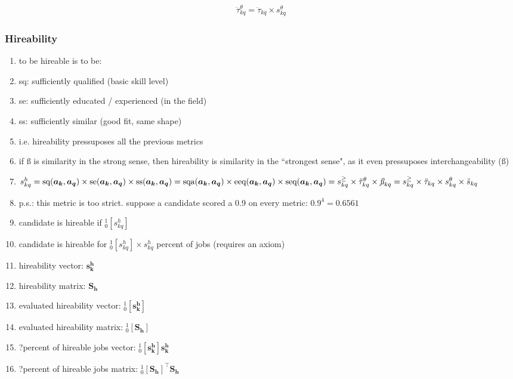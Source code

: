 \documentclass{elsarticle} %
\begin{document}
\begin{gather}
    \ddot{\tau}_{kq}^{\theta} = \ddot{\tau}_{kq} \times s_{kq}^{\theta}
\end{gather}

\subsubsection{Hireability}
\begin{enumerate}
    \item to be hireable is to be:
    \item sq: sufficiently qualified (basic skill level)
    \item se: sufficiently educated / experienced (in the field)
    \item ss: sufficiently similar (good fit, same shape)
    \item i.e. hireability pressuposes all the previous metrics
    \item if $\textit{\ss}$ is similarity in the strong sense, then hireability is
          similarity in the ``strongest sense", as it even pressuposes interchangeability
          ($\textit{\ss}$)
    \item $
              s_{kq}^{h} =
              \text{sq}(\boldsymbol{a_k},\boldsymbol{a_q}) \times
              \text{se}(\boldsymbol{a_k},\boldsymbol{a_q}) \times
              \text{ss}(\boldsymbol{a_k},\boldsymbol{a_q}) = \\
              \text{sqa}(\boldsymbol{a_k},\boldsymbol{a_q}) \times
              \text{eeq}(\boldsymbol{a_k},\boldsymbol{a_q}) \times
              \text{seq}(\boldsymbol{a_k},\boldsymbol{a_q}) = \\
              s_{kq}^{\geq} \times
              \ddot{\tau}_{kq}^{\theta} \times
              \textit{\ss}_{kq} = \\
              s_{kq}^{\geq} \times
              \ddot{\tau}_{kq} \times
              s_{kq}^{\theta} \times
              \ddot{s}_{kq}
          $
    \item p.s.: this metric is too strict. suppose a candidate scored a 0.9 on every
          metric: $0.9 ^ 4 = 0.6561$
    \item candidate is hireable if $_{0}^{1}[s_{kq}^{h}]$
    \item candidate is hireable for $_{0}^{1}[s_{kq}^{h}] \times s_{kq}^{h}$ percent of
          jobs (requires an axiom)
    \item hireability vector: $\boldsymbol{s_{k}^{h}}$
    \item hireability matrix: $\boldsymbol{\textbf{S}_{h}}$
    \item evaluated hireability vector: $_{0}^{1}[\boldsymbol{s_{k}^{h}}]$
    \item evaluated hireability matrix: $_{0}^{1}[\boldsymbol{\textbf{S}_{h}}]$
    \item ?percent of hireable jobs vector: $_{0}^{1}[\boldsymbol{s_{k}^{h}}]\boldsymbol{s_{k}^{h}}$
    \item ?percent of hireable jobs matrix: $_{0}^{1}[\boldsymbol{\textbf{S}_{h}}]^{\top}\boldsymbol{\textbf{S}_{h}}$
\end{enumerate}
\end{document}
